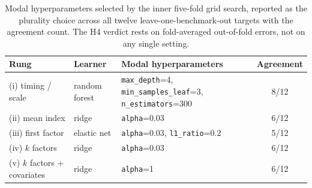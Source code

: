 \begin{table}[htbp]
\centering
\caption[Modal selected hyperparameters]{Modal hyperparameters selected by the inner five-fold grid search, reported as the plurality
choice across all twelve leave-one-benchmark-out targets with the agreement count. The H4 verdict rests
on fold-averaged out-of-fold errors, not on any single setting.}
\label{tab:hyper}
\small
\begin{tabular}{@{}lllc@{}}
\toprule
Rung & Learner & Modal hyperparameters & Agreement \\
\midrule
(i) timing / scale & random forest & \texttt{max\_depth}=4, \texttt{min\_samples\_leaf}=3, \texttt{n\_estimators}=300 & 8/12 \\
(ii) mean index & ridge & \texttt{alpha}=0.03 & 6/12 \\
(iii) first factor & elastic net & \texttt{alpha}=0.03, \texttt{l1\_ratio}=0.2 & 5/12 \\
(iv) $k$ factors & ridge & \texttt{alpha}=0.03 & 6/12 \\
(v) $k$ factors + covariates & ridge & \texttt{alpha}=1 & 6/12 \\
\bottomrule
\end{tabular}
\end{table}